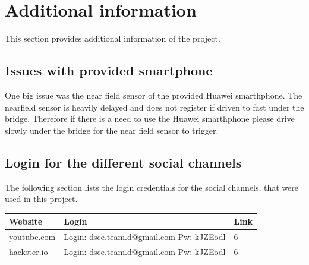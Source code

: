 \section{Additional information}
This section provides additional information of the project. 

\subsection{Issues with provided smartphone}
One big issue was the near field sensor of the provided Huawei smarthphone. The nearfield sensor is heavily delayed and does not register if driven to fast under the bridge. Therefore if there is a need to use the Huawei smarthphone please drive slowly under the bridge for the near field sensor to trigger. 

\subsection{Login for the different social channels}
The following section lists the login credentials for the social channels, that were used in this project.

\begin{tabular}{ l | p{5.6cm} | l }
	Website & Login & Link \\ \hline
	youtube.com & Login: dsce.team.d@gmail.com Pw: kJZEodl & 6 \\
	hackster.io & Login: dsce.team.d@gmail.com Pw: kJZEodl & 6 \\
\end{tabular}
